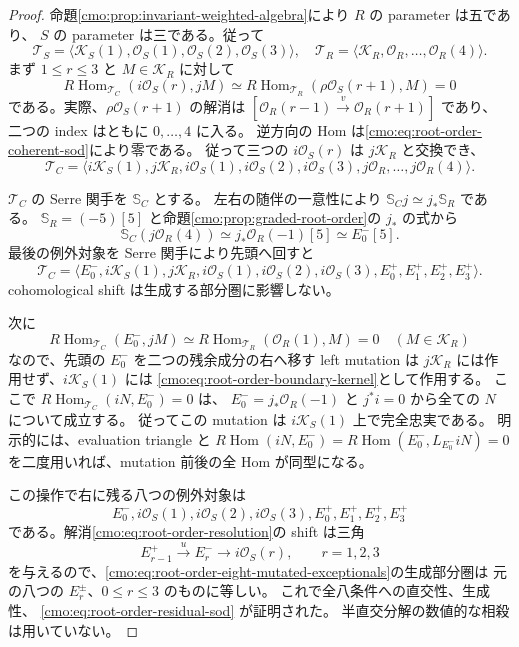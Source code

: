 \begin{proof}
命題\ref{cmo:prop:invariant-weighted-algebra}により $R$ の parameter は五であり、
$S$ の parameter は三である。従って
\[
 \mathcal T_S=
 \langle\mathcal K_S(1),\mathcal O_S(1),\mathcal O_S(2),\mathcal O_S(3)\rangle,
 \quad
 \mathcal T_R=\langle\mathcal K_R,\mathcal O_R,\ldots,\mathcal O_R(4)\rangle.
\]
まず $1\le r\le3$ と $M\in\mathcal K_R$ に対して
\[
 R\operatorname{Hom}_{\mathcal T_C}(i\mathcal O_S(r),jM)
 \simeq R\operatorname{Hom}_{\mathcal T_R}(\rho\mathcal O_S(r+1),M)=0
\]
である。実際、$\rho\mathcal O_S(r+1)$ の解消は
$[\mathcal O_R(r-1)\xrightarrow{v}\mathcal O_R(r+1)]$ であり、
二つの index はともに $0,\ldots,4$ に入る。
逆方向の Hom は\eqref{cmo:eq:root-order-coherent-sod}により零である。
従って三つの $i\mathcal O_S(r)$ は $j\mathcal K_R$ と交換でき、
\[
 \mathcal T_C=
 \langle i\mathcal K_S(1),j\mathcal K_R,
   i\mathcal O_S(1),i\mathcal O_S(2),i\mathcal O_S(3),
   j\mathcal O_R,\ldots,j\mathcal O_R(4)\rangle.
\]

$\mathcal T_C$ の Serre 関手を $\mathbb S_C$ とする。
左右の随伴の一意性により
$\mathbb S_Cj\simeq j_*\mathbb S_R$ である。
$\mathbb S_R=(-5)[5]$ と命題\ref{cmo:prop:graded-root-order}の $j_*$ の式から
\[
 \mathbb S_C(j\mathcal O_R(4))
 \simeq j_*\mathcal O_R(-1)[5]
 \simeq E_0^-[5].
\]
最後の例外対象を Serre 関手により先頭へ回すと
\begin{equation}
\label{cmo:eq:root-order-rotated-sod}
 \mathcal T_C=
 \langle E_0^-,i\mathcal K_S(1),j\mathcal K_R,
    i\mathcal O_S(1),i\mathcal O_S(2),i\mathcal O_S(3),
    E_0^+,E_1^+,E_2^+,E_3^+\rangle.
\end{equation}
cohomological shift は生成する部分圏に影響しない。

次に
\[
 R\operatorname{Hom}_{\mathcal T_C}(E_0^-,jM)
 \simeq R\operatorname{Hom}_{\mathcal T_R}(\mathcal O_R(1),M)=0
 \quad(M\in\mathcal K_R)
\]
なので、先頭の $E_0^-$ を二つの残余成分の右へ移す left mutation は
$j\mathcal K_R$ には作用せず、$i\mathcal K_S(1)$ には
\eqref{cmo:eq:root-order-boundary-kernel}として作用する。
ここで
$R\operatorname{Hom}_{\mathcal T_C}(iN,E_0^-)=0$ は、
$E_0^-=j_*\mathcal O_R(-1)$ と $j^*i=0$ から全ての $N$ について成立する。
従ってこの mutation は $i\mathcal K_S(1)$ 上で完全忠実である。
明示的には、evaluation triangle と
$R\operatorname{Hom}(iN,E_0^-)=R\operatorname{Hom}(E_0^-,L_{E_0^-}iN)=0$
を二度用いれば、mutation 前後の全 Hom が同型になる。

この操作で右に残る八つの例外対象は
\begin{equation}
\label{cmo:eq:root-order-eight-mutated-exceptionals}
 E_0^-,i\mathcal O_S(1),i\mathcal O_S(2),i\mathcal O_S(3),
 E_0^+,E_1^+,E_2^+,E_3^+
\end{equation}
である。解消\eqref{cmo:eq:root-order-resolution}の shift は三角
\[
 E_{r-1}^+\xrightarrow{u}E_r^-
 \longrightarrow i\mathcal O_S(r),\qquad r=1,2,3
\]
を与えるので、\eqref{cmo:eq:root-order-eight-mutated-exceptionals}の生成部分圏は
元の八つの $E_r^\pm$、$0\le r\le3$ のものに等しい。
これで全八条件への直交性、生成性、
\eqref{cmo:eq:root-order-residual-sod} が証明された。
半直交分解の数値的な相殺は用いていない。


\end{proof}
